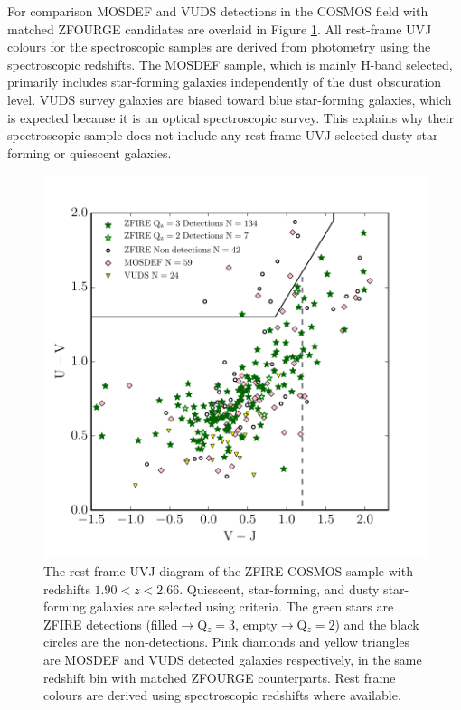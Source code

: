 \documentclass[iop]{emulateapj}
\begin{document}
For comparison MOSDEF and VUDS detections in the COSMOS field with matched ZFOURGE candidates are overlaid in Figure \ref{fig:UVJ}. All rest-frame UVJ colours for the spectroscopic samples are derived from photometry using the spectroscopic redshifts.  The MOSDEF sample, which is mainly H-band selected, 
primarily includes star-forming galaxies independently of the dust obscuration level. 
VUDS survey galaxies are biased toward blue star-forming galaxies, which is expected because it is an optical spectroscopic survey. This explains why their spectroscopic sample does not include any rest-frame UVJ selected dusty star-forming or quiescent galaxies.


\begin{figure}[h!]
\includegraphics[trim=12.5 10 0 0, clip, scale=0.625]{figures/Rest_frame_UVJ.pdf}
\caption{ The rest frame UVJ diagram of the ZFIRE-COSMOS sample with redshifts $1.90<z<2.66$. 
Quiescent, star-forming, and dusty star-forming galaxies are selected using \citet{Spitler2014} criteria. 
The green stars are ZFIRE detections (filled$\rightarrow$Q$_z=3$, empty$\rightarrow$Q$_z=2$) and the black circles  are the non-detections. 
Pink diamonds and yellow triangles are MOSDEF and VUDS detected galaxies respectively, in the same redshift bin with matched ZFOURGE counterparts.  
Rest frame colours are derived using spectroscopic redshifts where available. 
}
\label{fig:UVJ}
\end{figure}
\end{document}
